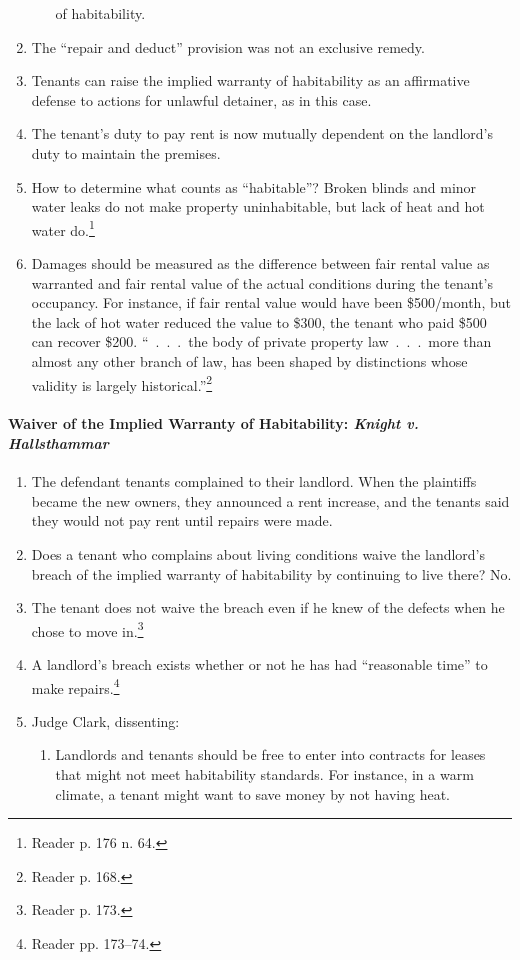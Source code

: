\begin{enumerate}
\begin{enumerate}
        of habitability.
    \end{enumerate}
    \item The ``repair and deduct'' provision was not an exclusive remedy.
    \item Tenants can raise the implied warranty of habitability as an 
    affirmative defense to actions for unlawful detainer, as in this case.
    \item The tenant's duty to pay rent is now mutually dependent on the 
    landlord's duty to maintain the premises.
    \item How to determine what counts as ``habitable''? Broken blinds and 
    minor water leaks do not make property uninhabitable, but lack of heat and 
    hot water do.\footnote{Reader p. 176 n. 64.}
    \item Damages should be measured as the difference between fair rental 
    value as warranted and fair rental value of the actual conditions during 
    the tenant's occupancy. For instance, if fair rental value would have been 
    \$500/month, but the lack of hot water reduced the value to \$300, the 
    tenant who paid \$500 can recover \$200.
    ``~.~.~.~the body of private property law~.~.~.~more than almost any other 
    branch of law, has been shaped by distinctions whose validity is largely 
    historical.''\footnote{Reader p. 168.}
\end{enumerate}

\paragraph{Waiver of the Implied Warranty of Habitability: \emph{Knight v. 
Hallsthammar}}

\begin{enumerate}
    \item The defendant tenants complained to their landlord. When the 
    plaintiffs became the new owners, they announced a rent increase, and the 
    tenants said they would not pay rent until repairs were made.
    \item Does a tenant who complains about living conditions waive the 
    landlord's breach of the implied warranty of habitability by continuing to 
    live there? No.
    \item The tenant does not waive the breach even if he knew of the defects 
    when he chose to move in.\footnote{Reader p. 173.}
    \item A landlord's breach exists whether or not he has had ``reasonable 
    time'' to make repairs.\footnote{Reader pp. 173--74.}
    \item Judge Clark, dissenting:
    \begin{enumerate}
        \item Landlords and tenants should be free to enter into contracts for 
        leases that might not meet habitability standards. For instance, in a 
        warm climate, a tenant might want to save money by not having heat.
    \end{enumerate}
\end{enumerate}

